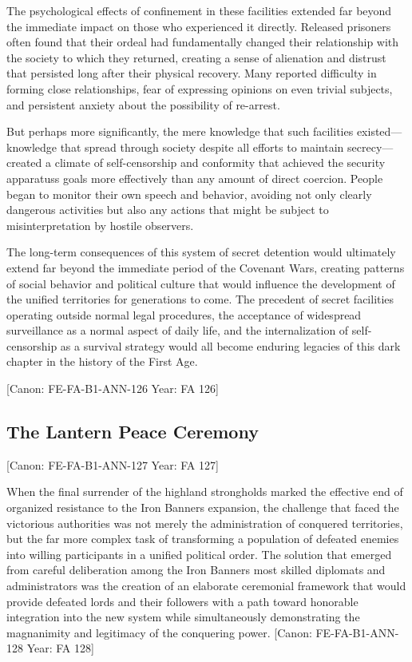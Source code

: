 The psychological effects of confinement in these facilities extended
far beyond the immediate impact on those who experienced it directly.
Released prisoners often found that their ordeal had fundamentally
changed their relationship with the society to which they returned,
creating a sense of alienation and distrust that persisted long after
their physical recovery. Many reported difficulty in forming close
relationships, fear of expressing opinions on even trivial subjects, and
persistent anxiety about the possibility of re-arrest.

But perhaps more significantly, the mere knowledge that such facilities
existed---knowledge that spread through society despite all efforts to
maintain secrecy---created a climate of self-censorship and conformity
that achieved the security apparatus\textquotesingle s goals more
effectively than any amount of direct coercion. People began to monitor
their own speech and behavior, avoiding not only clearly dangerous
activities but also any actions that might be subject to
misinterpretation by hostile observers.

The long-term consequences of this system of secret detention would
ultimately extend far beyond the immediate period of the Covenant Wars,
creating patterns of social behavior and political culture that would
influence the development of the unified territories for generations to
come. The precedent of secret facilities operating outside normal legal
procedures, the acceptance of widespread surveillance as a normal aspect
of daily life, and the internalization of self-censorship as a survival
strategy would all become enduring legacies of this dark chapter in the
history of the First Age.

{[}Canon: FE-FA-B1-ANN-126 \textbar{} Year: FA 126{]}

\subsection{The Lantern Peace
Ceremony}\label{the-lantern-peace-ceremony}

{[}Canon: FE-FA-B1-ANN-127 \textbar{} Year: FA 127{]}

When the final surrender of the highland strongholds marked the
effective end of organized resistance to the Iron
Banner\textquotesingle s expansion, the challenge that faced the
victorious authorities was not merely the administration of conquered
territories, but the far more complex task of transforming a population
of defeated enemies into willing participants in a unified political
order. The solution that emerged from careful deliberation among the
Iron Banner\textquotesingle s most skilled diplomats and administrators
was the creation of an elaborate ceremonial framework that would provide
defeated lords and their followers with a path toward honorable
integration into the new system while simultaneously demonstrating the
magnanimity and legitimacy of the conquering power. {[}Canon:
FE-FA-B1-ANN-128 \textbar{} Year: FA 128{]}

